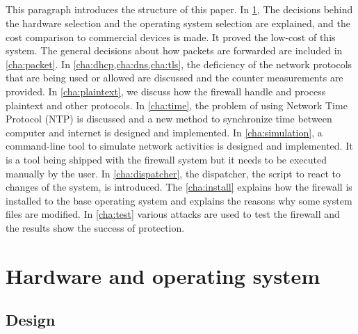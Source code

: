 \documentclass[mscthesis]{usiinfthesis}
\begin{document}
\paragraph{}
This paragraph introduces the structure of this paper. In \cref{cha:hard}, The decisions behind the hardware selection and the operating system selection are explained, and the cost comparison to commercial devices is made. It proved the low-cost of this system. The general decisions about how packets are forwarded are included in \cref{cha:packet}. In \cref{cha:dhcp,cha:dns,cha:tls}, the deficiency of the network protocols that are being used or allowed are discussed and the counter measurements are provided. In \cref{cha:plaintext}, we discuss how the firewall handle and process plaintext and other protocols. In \cref{cha:time}, the problem of using Network Time Protocol (NTP) is discussed and a new method to synchronize time between computer and internet is designed and implemented. In \cref{cha:simulation}, a command-line tool to simulate network activities is designed and implemented. It is a tool being shipped with the firewall system but it needs to be executed manually by the user. In \cref{cha:dispatcher}, the dispatcher, the script to react to changes of the system, is introduced. The \cref{cha:install} explains how the firewall is installed to the base operating system and explains the reasons why some system files are modified. In \cref{cha:test} various attacks are used to test the firewall and the results show the success of protection.

\chapter{Hardware and operating system}\label{cha:hard}
\section{Design}
\end{document}

